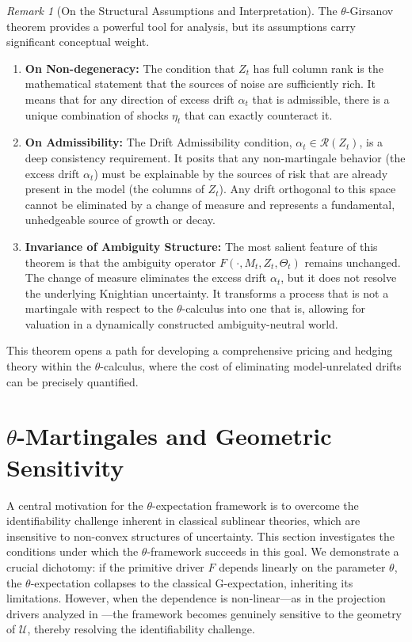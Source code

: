 \documentclass[12pt, letterpaper]{amsart}
\newcommand{\Ucal}{\mathcal{U}}
\theoremstyle{plain}
\theoremstyle{definition}
\theoremstyle{remark}
\newtheorem{remark}[theorem]{Remark}
\numberwithin{equation}{section} %
\begin{document}
\begin{remark}[On the Structural Assumptions and Interpretation]
\label{rem:girsanov_interpretation}
The \(\theta\)-Girsanov theorem provides a powerful tool for analysis, but its assumptions carry significant conceptual weight.
\begin{enumerate}
    \item \textbf{On Non-degeneracy:} The condition that \(Z_t\) has full column rank is the mathematical statement that the sources of noise are sufficiently rich. It means that for any direction of excess drift \(\alpha_t\) that is admissible, there is a unique combination of shocks \(\eta_t\) that can exactly counteract it.
    \item \textbf{On Admissibility:} The Drift Admissibility condition, \(\alpha_t \in \mathcal{R}(Z_t)\), is a deep consistency requirement. It posits that any non-martingale behavior (the excess drift \(\alpha_t\)) must be explainable by the sources of risk that are already present in the model (the columns of \(Z_t\)). Any drift orthogonal to this space cannot be eliminated by a change of measure and represents a fundamental, unhedgeable source of growth or decay.
    \item \textbf{Invariance of Ambiguity Structure:} The most salient feature of this theorem is that the ambiguity operator \(F(\cdot, M_t, Z_t, \Theta_t)\) remains unchanged. The change of measure eliminates the excess drift \(\alpha_t\), but it does not resolve the underlying Knightian uncertainty. It transforms a process that is not a martingale with respect to the \(\theta\)-calculus into one that is, allowing for valuation in a dynamically constructed ambiguity-neutral world.
\end{enumerate}
This theorem opens a path for developing a comprehensive pricing and hedging theory within the \(\theta\)-calculus, where the cost of eliminating model-unrelated drifts can be precisely quantified.
\end{remark}

\section{\texorpdfstring{$\theta$}{theta}-Martingales and Geometric Sensitivity}
\label{sec:geometric_sensitivity_revised}

A central motivation for the \(\theta\)-expectation framework is to overcome the identifiability challenge inherent in classical sublinear theories, which are insensitive to non-convex structures of uncertainty. This section investigates the conditions under which the \(\theta\)-framework succeeds in this goal. We demonstrate a crucial dichotomy: if the primitive driver \(F\) depends linearly on the parameter \(\theta\), the \(\theta\)-expectation collapses to the classical G-expectation, inheriting its limitations. However, when the dependence is non-linear—as in the projection drivers analyzed in —the framework becomes genuinely sensitive to the geometry of \(\Ucal\), thereby resolving the identifiability challenge.
\end{document}
